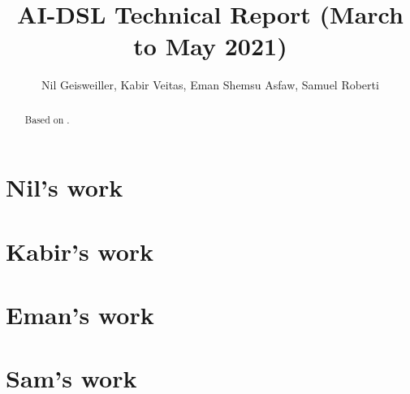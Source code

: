 \documentclass[]{report}
\begin{document}
\title{AI-DSL Technical Report (March to May 2021)}
\author{Nil Geisweiller, Kabir Veitas, Eman Shemsu Asfaw, Samuel Roberti}
\maketitle

\begin{abstract}
  Based on \cite{GoertzelGeisweillerBlog}.
\end{abstract}

\chapter{Nil's work}

\chapter{Kabir's work}

\chapter{Eman's work}

\chapter{Sam's work}



\end{document}
